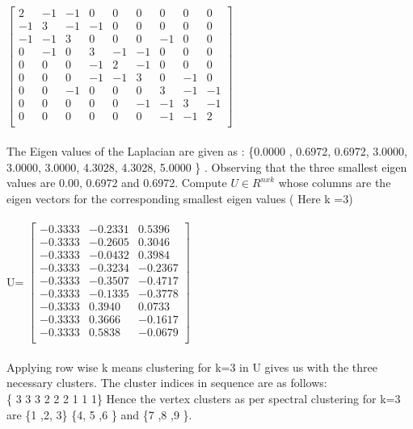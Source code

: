 $\begin{bmatrix}
2  &   -1  &   -1   &   0   &   0   &   0   &   0  &    0   &   0\\
-1    &  3   &  -1   &  -1   &   0   &   0   &   0   &   0    &  0 \\
-1   &  -1   &   3   &   0   &   0   &   0   &  -1   &   0   &   0  \\
0    & -1    &  0   &   3   &  -1   &  -1   &   0   &   0   &   0 \\
0    &  0   &   0   &  -1   &   2    & -1    &  0    &  0   &   0 \\
0     & 0    &  0    & -1   &  -1   &   3    &  0   &  -1    &  0 \\
0     & 0  &   -1   &   0    &  0    &  0   &   3   &  -1   &  -1 \\
0    &  0    &  0   &   0   &   0   &  -1  &   -1   &   3   &  -1 \\
0     & 0    &  0  &    0    &  0   &   0   &  -1   &  -1   &   2 \\
\end{bmatrix}
$ \\ \\
The Eigen values of the Laplacian are given as : \{0.0000 , 0.6972, 0.6972, 3.0000, 3.0000,
3.0000, 4.3028, 4.3028, 5.0000 \} . Observing that the three smallest eigen values are 0.00, 0.6972 and 0.6972. 
Compute $U \in R^{n x k}$ whose columns are the eigen vectors for the corresponding smallest eigen values ( Here k =3)\\ \\
U=
$
\begin{bmatrix}
-0.3333  & -0.2331 &   0.5396 \\
-0.3333  & -0.2605 &   0.3046 \\
-0.3333  & -0.0432 &   0.3984 \\
-0.3333  & -0.3234  &-0.2367 \\
-0.3333  & -0.3507 &  -0.4717 \\
-0.3333  & -0.1335   &-0.3778 \\
-0.3333  &  0.3940  &  0.0733 \\
-0.3333  & 0.3666  & -0.1617 \\
-0.3333  &  0.5838 &  -0.0679 \\
\end{bmatrix}
$ \\ \\
Applying row wise k means clustering for k=3 in U gives us with the three necessary clusters. The cluster indices in sequence are as follows: \\
\{ 3 3 3 2 2 2 1 1 1\}
Hence the vertex clusters as per spectral clustering for k=3 are \{1 ,2, 3\} \{4, 5 ,6 \} and \{7 ,8 ,9 \}.

